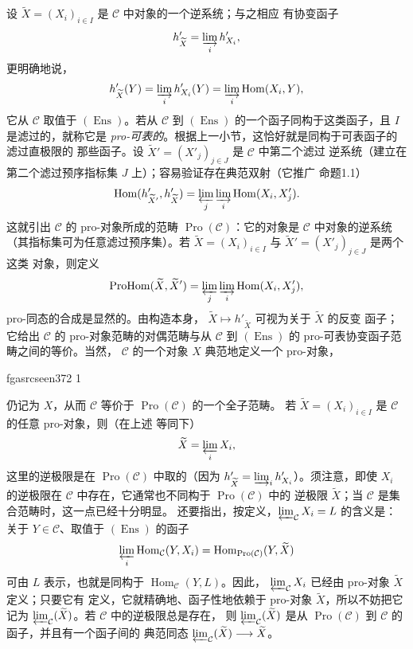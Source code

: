 \documentclass[12pt,twoside,openany]{book}
\numberwithin{equation}{section}
\newcommand{\fgaunitid}{unbound}
\newcommand{\src}[1]{%
  \phantomsection
  \hypertarget{src:\fgaunitid:#1}{}%
  \hypertarget{fga.\fgaunitid.p#1}{}%
  \ifcsname fgasrcseen#1\endcsname\else
    \expandafter\gdef\csname fgasrcseen#1\endcsname{1}%
    \hypertarget{src:#1}{}%
  \fi
  \marginpar{\raggedleft\footnotesize\sffamily #1}%
}
\theoremstyle{plain}
\theoremstyle{definition}
\theoremstyle{remark}
\begin{document}
设 $\widetilde X=(X_i)_{i\in I}$ 是 $\mathcal C$ 中对象的一个逆系统；与之相应
有协变函子
\[
  h'_{\widetilde X}=\varinjlim_i h'_{X_i},
\]
更明确地说，
\[
  h'_{\widetilde X}(Y)=\varinjlim_i h'_{X_i}(Y)
  =\varinjlim_i\operatorname{Hom}(X_i,Y),
\]
它从 $\mathcal C$ 取值于 $(\operatorname{Ens})$。若从 $\mathcal C$ 到
$(\operatorname{Ens})$ 的一个函子同构于这类函子，且 $I$ 是滤过的，就称它是
\emph{pro-可表的}。根据上一小节，这恰好就是同构于可表函子的滤过直极限的
那些函子。设 $\widetilde X'=(X'_j)_{j\in J}$ 是 $\mathcal C$ 中第二个滤过
逆系统（建立在第二个滤过预序指标集 $J$ 上）；容易验证存在典范双射（它推广
命题1.1）
\[
  \operatorname{Hom}(h'_{\widetilde X'},h'_{\widetilde X})
  =\varprojlim_j\varinjlim_i\operatorname{Hom}(X_i,X'_j).
\]
这就引出 $\mathcal C$ 的 pro-对象所成的范畴
$\operatorname{Pro}(\mathcal C)$：它的对象是 $\mathcal C$ 中对象的逆系统
（其指标集可为任意滤过预序集）。若
$\widetilde X=(X_i)_{i\in I}$ 与 $\widetilde X'=(X'_j)_{j\in J}$ 是两个这类
对象，则定义
\[
  \operatorname{ProHom}(\widetilde X,\widetilde X')
  =\varprojlim_j\varinjlim_i\operatorname{Hom}(X_i,X'_j),
\]
pro-同态的合成是显然的。由构造本身，
$\widetilde X\longmapsto h'_{\widetilde X}$ 可视为关于 $\widetilde X$ 的反变
函子；它给出 $\mathcal C$ 的 pro-对象范畴的对偶范畴与从 $\mathcal C$ 到
$(\operatorname{Ens})$ 的 pro-可表协变函子范畴之间的等价。当然，
$\mathcal C$ 的一个对象 $X$ 典范地定义一个 pro-对象，

\src{372}
仍记为 $X$，从而 $\mathcal C$ 等价于
$\operatorname{Pro}(\mathcal C)$ 的一个全子范畴。
若 $\widetilde X=(X_i)_{i\in I}$ 是 $\mathcal C$ 的任意 pro-对象，则（在上述
等同下）
\[
  \widetilde X=\varprojlim_i X_i,
\]
这里的逆极限是在 $\operatorname{Pro}(\mathcal C)$ 中取的（因为
$h'_{\widetilde X}=\varinjlim_i h'_{X_i}$）。须注意，即使 $X_i$ 的逆极限在
$\mathcal C$ 中存在，它通常也不同构于 $\operatorname{Pro}(\mathcal C)$ 中的
逆极限 $\widetilde X$；当 $\mathcal C$ 是集合范畴时，这一点已经十分明显。
还要指出，按定义，$\varprojlim_{\mathcal C}X_i=L$ 的含义是：关于
$Y\in\mathcal C$、取值于 $(\operatorname{Ens})$ 的函子
\[
  \varprojlim_i\operatorname{Hom}_{\mathcal C}(Y,X_i)
  =\operatorname{Hom}_{\operatorname{Pro}(\mathcal C)}(Y,\widetilde X)
\]
可由 $L$ 表示，也就是同构于 $\operatorname{Hom}_{\mathcal C}(Y,L)$。因此，
$\varprojlim_{\mathcal C}X_i$ 已经由 pro-对象 $\widetilde X$ 定义；只要它有
定义，它就精确地、函子性地依赖于 pro-对象 $\widetilde X$，所以不妨把它记为
$\varprojlim_{\mathcal C}(\widetilde X)$。若 $\mathcal C$ 中的逆极限总是存在，
则 $\varprojlim_{\mathcal C}(\widetilde X)$ 是从
$\operatorname{Pro}(\mathcal C)$ 到 $\mathcal C$ 的函子，并且有一个函子间的
典范同态
$\varprojlim_{\mathcal C}(\widetilde X)\longrightarrow\widetilde X$。
\end{document}
